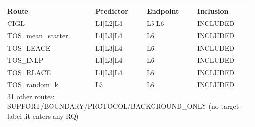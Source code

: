 \begin{tabular}{llll}
\toprule
Route & Predictor & Endpoint & Inclusion \\
\midrule
CIGL & L1|L2|L4 & L5|L6 & INCLUDED \\
TOS\_mean\_scatter & L1|L3|L4 & L6 & INCLUDED \\
TOS\_LEACE & L1|L3|L4 & L6 & INCLUDED \\
TOS\_INLP & L1|L3|L4 & L6 & INCLUDED \\
TOS\_RLACE & L1|L3|L4 & L6 & INCLUDED \\
TOS\_random\_k & L3 & L6 & INCLUDED \\
\midrule
\multicolumn{4}{l}{31 other routes: SUPPORT/BOUNDARY/PROTOCOL/BACKGROUND\_ONLY (no target-label fit enters any RQ)} \\
\bottomrule
\end{tabular}
